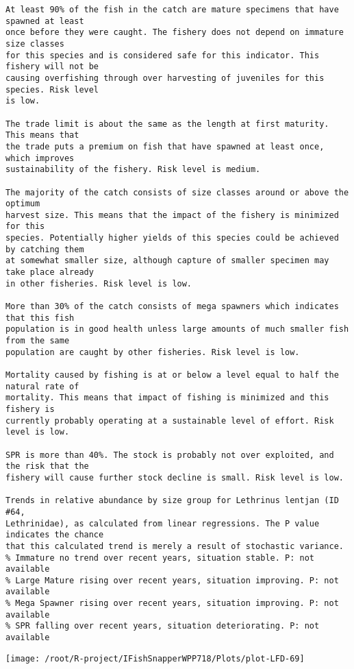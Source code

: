 \documentclass{report}\usepackage[]{graphicx}\usepackage[]{color}
\makeatletter
\def\maxwidth{ %
  \ifdim\Gin@nat@width>\linewidth
    \linewidth
  \else
    \Gin@nat@width
  \fi
}
\newenvironment{kframe}{%
 \def\at@end@of@kframe{}%
 \ifinner\ifhmode%
  \def\at@end@of@kframe{\end{minipage}}%
  \begin{minipage}{\columnwidth}%
 \fi\fi%
 \def\FrameCommand##1{\hskip\@totalleftmargin \hskip-\fboxsep
 \colorbox{shadecolor}{##1}\hskip-\fboxsep
     \hskip-\linewidth \hskip-\@totalleftmargin \hskip\columnwidth}%
 \MakeFramed {\advance\hsize-\width
   \@totalleftmargin\z@ \linewidth\hsize
   \@setminipage}}%
 {\par\unskip\endMakeFramed%
 \at@end@of@kframe}
\newenvironment{knitrout}{}{} %
\makeatother
\begin{document}
\begin{knitrout}
\begin{kframe}
\begin{verbatim}
At least 90% of the fish in the catch are mature specimens that have spawned at least
once before they were caught. The fishery does not depend on immature size classes
for this species and is considered safe for this indicator. This fishery will not be
causing overfishing through over harvesting of juveniles for this species. Risk level
is low.

The trade limit is about the same as the length at first maturity.  This means that
the trade puts a premium on fish that have spawned at least once, which improves
sustainability of the fishery. Risk level is medium.

The majority of the catch consists of size classes around or above the optimum
harvest size. This means that the impact of the fishery is minimized for this
species. Potentially higher yields of this species could be achieved by catching them
at somewhat smaller size, although capture of smaller specimen may take place already
in other fisheries. Risk level is low.

More than 30% of the catch consists of mega spawners which indicates that this fish
population is in good health unless large amounts of much smaller fish from the same
population are caught by other fisheries. Risk level is low.
 
Mortality caused by fishing is at or below a level equal to half the natural rate of
mortality. This means that impact of fishing is minimized and this fishery is
currently probably operating at a sustainable level of effort. Risk level is low.
 
SPR is more than 40%. The stock is probably not over exploited, and the risk that the
fishery will cause further stock decline is small. Risk level is low.
 
Trends in relative abundance by size group for Lethrinus lentjan (ID #64,
Lethrinidae), as calculated from linear regressions. The P value indicates the chance
that this calculated trend is merely a result of stochastic variance.
% Immature no trend over recent years, situation stable. P: not available
% Large Mature rising over recent years, situation improving. P: not available
% Mega Spawner rising over recent years, situation improving. P: not available
% SPR falling over recent years, situation deteriorating. P: not available
\end{verbatim}
\end{kframe}
\texttt{[image: /root/R-project/IFishSnapperWPP718/Plots/plot-LFD-69]} 


\end{knitrout}
\end{document}
